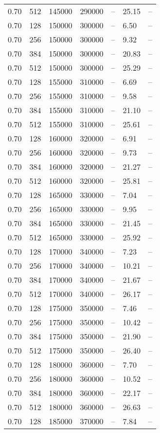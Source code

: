 \begin{tabular}{l|l|l|l|l|l|l}
0.70 & 512 & 145000 & 290000 & -- & 25.15 & --\\
0.70 & 128 & 150000 & 300000 & -- &  6.50 & --\\
0.70 & 256 & 150000 & 300000 & -- &  9.32 & --\\
0.70 & 384 & 150000 & 300000 & -- & 20.83 & --\\
0.70 & 512 & 150000 & 300000 & -- & 25.29 & --\\
0.70 & 128 & 155000 & 310000 & -- &  6.69 & --\\
0.70 & 256 & 155000 & 310000 & -- &  9.58 & --\\
0.70 & 384 & 155000 & 310000 & -- & 21.10 & --\\
0.70 & 512 & 155000 & 310000 & -- & 25.61 & --\\
0.70 & 128 & 160000 & 320000 & -- &  6.91 & --\\
0.70 & 256 & 160000 & 320000 & -- &  9.73 & --\\
0.70 & 384 & 160000 & 320000 & -- & 21.27 & --\\
0.70 & 512 & 160000 & 320000 & -- & 25.81 & --\\
0.70 & 128 & 165000 & 330000 & -- &  7.04 & --\\
0.70 & 256 & 165000 & 330000 & -- &  9.95 & --\\
0.70 & 384 & 165000 & 330000 & -- & 21.45 & --\\
0.70 & 512 & 165000 & 330000 & -- & 25.92 & --\\
0.70 & 128 & 170000 & 340000 & -- &  7.23 & --\\
0.70 & 256 & 170000 & 340000 & -- & 10.21 & --\\
0.70 & 384 & 170000 & 340000 & -- & 21.67 & --\\
0.70 & 512 & 170000 & 340000 & -- & 26.17 & --\\
0.70 & 128 & 175000 & 350000 & -- &  7.46 & --\\
0.70 & 256 & 175000 & 350000 & -- & 10.42 & --\\
0.70 & 384 & 175000 & 350000 & -- & 21.90 & --\\
0.70 & 512 & 175000 & 350000 & -- & 26.40 & --\\
0.70 & 128 & 180000 & 360000 & -- &  7.70 & --\\
0.70 & 256 & 180000 & 360000 & -- & 10.52 & --\\
0.70 & 384 & 180000 & 360000 & -- & 22.17 & --\\
0.70 & 512 & 180000 & 360000 & -- & 26.63 & --\\
0.70 & 128 & 185000 & 370000 & -- &  7.84 & --\\

\end{tabular}
